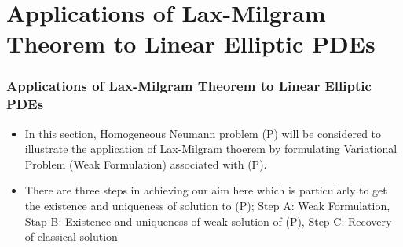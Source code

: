 \documentclass[7pt]{beamer}
\begin{document}
\section{Applications of Lax-Milgram Theorem to Linear Elliptic PDEs}
\begin{frame}
 \frametitle{Applications of Lax-Milgram Theorem to Linear Elliptic PDEs}
\begin{itemize}
\item In this section, Homogeneous Neumann problem (P) will be considered to illustrate the application of 
Lax-Milgram thoerem by formulating Variational Problem (Weak Formulation) associated with (P).\\
\item There are three steps in achieving our aim here which is particularly to get the existence and uniqueness of solution to (P);
Step A: Weak Formulation, Stap B: Existence and uniqueness of weak solution of (P), Step C: Recovery of classical solution
\end{itemize}
\end{frame}
\end{document}
